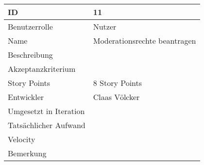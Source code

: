 \begin{tabularx}{\textwidth}{|p{}|X|}
	\hline
	ID & 11\\
	\hline
	Benutzerrolle & Nutzer\\
	\hline
	Name & Moderationsrechte beantragen\\
	\hline
	Beschreibung & \\
	\hline
	Akzeptanzkriterium & \\
	\hline
	Story Points & 8 Story Points\\
	\hline
	Entwickler & Claas Völcker\\
	\hline
	Umgesetzt in Iteration & \\
	\hline
	Tatsächlicher Aufwand & \\
	\hline
	Velocity & \\
	\hline
	Bemerkung & \\
	\hline
\end{tabularx}
\vspace{20pt}
